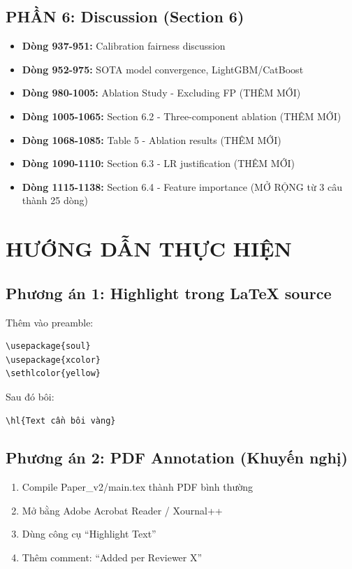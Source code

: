 \documentclass[11pt,a4paper]{article}
\begin{document}
\subsection{PHẦN 6: Discussion (Section 6)}
\begin{itemize}
    \item \textbf{Dòng 937-951:} Calibration fairness discussion
    \item \textbf{Dòng 952-975:} SOTA model convergence, LightGBM/CatBoost
    \item \textbf{Dòng 980-1005:} Ablation Study - Excluding FP (THÊM MỚI)
    \item \textbf{Dòng 1005-1065:} Section 6.2 - Three-component ablation (THÊM MỚI)
    \item \textbf{Dòng 1068-1085:} Table 5 - Ablation results (THÊM MỚI)
    \item \textbf{Dòng 1090-1110:} Section 6.3 - LR justification (THÊM MỚI)
    \item \textbf{Dòng 1115-1138:} Section 6.4 - Feature importance (MỞ RỘNG từ 3 câu thành 25 dòng)
\end{itemize}

\section{HƯỚNG DẪN THỰC HIỆN}

\subsection{Phương án 1: Highlight trong LaTeX source}
Thêm vào preamble:
\begin{verbatim}
\usepackage{soul}
\usepackage{xcolor}
\sethlcolor{yellow}
\end{verbatim}

Sau đó bôi:
\begin{verbatim}
\hl{Text cần bôi vàng}
\end{verbatim}

\subsection{Phương án 2: PDF Annotation (Khuyến nghị)}
\begin{enumerate}
    \item Compile Paper\_v2/main.tex thành PDF bình thường
    \item Mở bằng Adobe Acrobat Reader / Xournal++
    \item Dùng công cụ ``Highlight Text''
    \item Thêm comment: ``Added per Reviewer X''
\end{enumerate}
\end{document}
